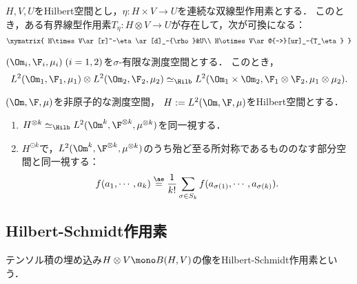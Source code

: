 \documentclass[uplatex,dvipdfmx]{jsreport}
\begin{document}
\begin{proposition}
    $H,V,U$をHilbert空間とし，$\eta:H\times V\to U$を連続な双線型作用素とする．
    このとき，ある有界線型作用素$T_\eta:H\otimes V\to U$が存在して，次が可換になる：
    \[\xymatrix{
        H\times V\ar[r]^-\eta\ar[d]_-{\rho}&U\\
        H\otimes V\ar@{-->}[ur]_-{T_\eta}
    }\]
\end{proposition}

\begin{corollary}[$L^2$-空間のテンソル積]
    $(\Om_i,\F_i,\mu_i)\;(i=1,2)$を$\sigma$-有限な測度空間とする．
    このとき，
    \[L^2(\Om_1,\F_1,\mu_1)\otimes L^2(\Om_2,\F_2,\mu_2)\simeq_\Hilb L^2(\Om_1\times\Om_2,\F_1\otimes\F_2,\mu_1\otimes\mu_2).\]
\end{corollary}

\begin{definition}
    $(\Om,\F,\mu)$を非原子的な測度空間，
    $H:=L^2(\Om,\F,\mu)$をHilbert空間とする．
    \begin{enumerate}
        \item $H^{\otimes k}\simeq_\Hilb L^2(\Om^k,\F^{\otimes k},\mu^{\otimes k})$を同一視する．
        \item $H^{\odot k}$で，$L^2(\Om^k,\F^{\otimes k},\mu^{\otimes k})$のうち殆ど至る所対称であるもののなす部分空間と同一視する：
        \[f(a_1,\cdots,a_k)\overset{\ae}{=}\frac{1}{k!}\sum_{\sigma\in S_k}f(a_{\sigma(1)},\cdots,a_{\sigma(k)}).\]
    \end{enumerate}
\end{definition}

\subsection{Hilbert-Schmidt作用素}

\begin{tcolorbox}[colframe=ForestGreen, colback=ForestGreen!10!white,breakable,colbacktitle=ForestGreen!40!white,coltitle=black,fonttitle=\bfseries\sffamily,
title=]
    テンソル積の埋め込み$H\otimes V\mono B(H,V)$の像をHilbert-Schmidt作用素という．
\end{tcolorbox}
\end{document}
